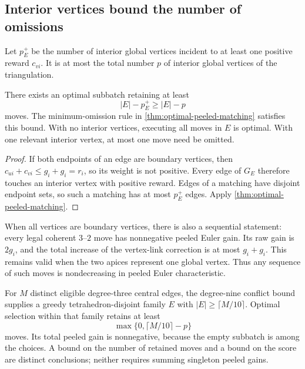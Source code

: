 \subsection{Interior vertices bound the number of omissions}
\label{sec:interior-omission-bound}

Let $p_E^+$ be the number of interior global vertices incident to
at least one positive reward $c_{vi}$. It is at most the total
number $p$ of interior global vertices of the triangulation.

\begin{corollary}
\label{cor:interior-omission-bound}
There exists an optimal subbatch retaining at least
\[
 |E|-p_E^+\ge |E|-p
\]
moves. The minimum-omission rule in
\cref{thm:optimal-peeled-matching} satisfies this bound. With no
interior vertices, executing all moves in $E$ is optimal. With
one relevant interior vertex, at most one move need be omitted.
\end{corollary}
\begin{proof}
If both endpoints of an edge are boundary vertices, then
$c_{ui}+c_{vi}\le g_i+g_i=r_i$, so its weight is not positive.
Every edge of $G_E$ therefore touches an interior vertex with
positive reward. Edges of a matching have disjoint endpoint sets,
so such a matching has at most $p_E^+$ edges. Apply
\cref{thm:optimal-peeled-matching}.
\end{proof}

When all vertices are boundary vertices, there is also a sequential
statement: every legal coherent $3$--$2$ move has nonnegative peeled
Euler gain. Its raw gain is $2g_i$, and the total increase of the
vertex-link correction is at most $g_i+g_i$. This remains valid
when the two apices represent one global vertex. Thus any sequence
of such moves is nondecreasing in peeled Euler characteristic.

For $M$ distinct eligible degree-three central edges, the
degree-nine conflict bound supplies a greedy tetrahedron-disjoint
family $E$ with $|E|\ge\lceil M/10\rceil$. Optimal selection within
that family retains at least
\begin{equation}\label{eq:packed-retention}
 \max\{0,\lceil M/10\rceil-p\}
\end{equation}
moves. Its total peeled gain is nonnegative, because the empty
subbatch is among the choices. A bound on the number of retained
moves and a bound on the score are distinct conclusions; neither
requires summing singleton peeled gains.


